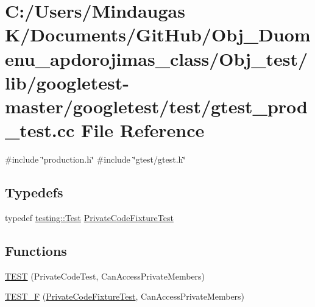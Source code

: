 \hypertarget{_obj__test_2lib_2googletest-master_2googletest_2test_2gtest__prod__test_8cc}{}\section{C\+:/\+Users/\+Mindaugas K/\+Documents/\+Git\+Hub/\+Obj\+\_\+\+Duomenu\+\_\+apdorojimas\+\_\+class/\+Obj\+\_\+test/lib/googletest-\/master/googletest/test/gtest\+\_\+prod\+\_\+test.cc File Reference}
\label{_obj__test_2lib_2googletest-master_2googletest_2test_2gtest__prod__test_8cc}
{\ttfamily \#include \char`\"{}production.\+h\char`\"{}}\newline
{\ttfamily \#include \char`\"{}gtest/gtest.\+h\char`\"{}}\newline
\subsection*{Typedefs}
\begin{DoxyCompactItemize}
\item 
typedef \mbox{\hyperlink{classtesting_1_1_test}{testing\+::\+Test}} \mbox{\hyperlink{_obj__test_2lib_2googletest-master_2googletest_2test_2gtest__prod__test_8cc_a89debba10c803e339ce0f9b0b34a2267}{Private\+Code\+Fixture\+Test}}
\end{DoxyCompactItemize}
\subsection*{Functions}
\begin{DoxyCompactItemize}
\item 
\mbox{\hyperlink{_obj__test_2lib_2googletest-master_2googletest_2test_2gtest__prod__test_8cc_a8e307a199011c2979d4a63464d245f4a}{T\+E\+ST}} (Private\+Code\+Test, Can\+Access\+Private\+Members)
\item 
\mbox{\hyperlink{_obj__test_2lib_2googletest-master_2googletest_2test_2gtest__prod__test_8cc_a5e21e7e8dd53f2de05e9e6941b6612d3}{T\+E\+S\+T\+\_\+F}} (\mbox{\hyperlink{googletest-master_2googletest_2test_2gtest__prod__test_8cc_a89debba10c803e339ce0f9b0b34a2267}{Private\+Code\+Fixture\+Test}}, Can\+Access\+Private\+Members)
\end{DoxyCompactItemize}


